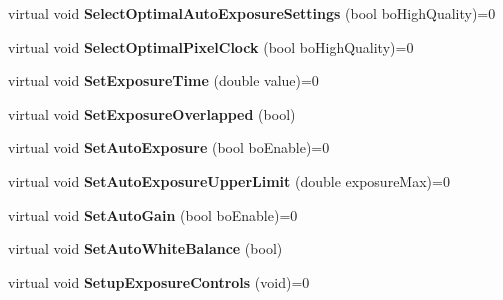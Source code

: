 \begin{DoxyCompactItemize}
\item 
\hypertarget{class_wizard_quick_setup_a2f8ee08dfc710941053f2c117c355d51}{virtual void {\bfseries Select\+Optimal\+Auto\+Exposure\+Settings} (bool bo\+High\+Quality)=0}\label{class_wizard_quick_setup_a2f8ee08dfc710941053f2c117c355d51}

\item 
\hypertarget{class_wizard_quick_setup_a4be31bcd65dd72a6eec785b3e96442d8}{virtual void {\bfseries Select\+Optimal\+Pixel\+Clock} (bool bo\+High\+Quality)=0}\label{class_wizard_quick_setup_a4be31bcd65dd72a6eec785b3e96442d8}

\item 
\hypertarget{class_wizard_quick_setup_a62c9bf4edce91124d4261d2ba4fbc48d}{virtual void {\bfseries Set\+Exposure\+Time} (double value)=0}\label{class_wizard_quick_setup_a62c9bf4edce91124d4261d2ba4fbc48d}

\item 
\hypertarget{class_wizard_quick_setup_a4da8f26366f409a6d160e8e6f76f0ea8}{virtual void {\bfseries Set\+Exposure\+Overlapped} (bool)}\label{class_wizard_quick_setup_a4da8f26366f409a6d160e8e6f76f0ea8}

\item 
\hypertarget{class_wizard_quick_setup_ad79f23a6992b0265f1efc24f1ca22c86}{virtual void {\bfseries Set\+Auto\+Exposure} (bool bo\+Enable)=0}\label{class_wizard_quick_setup_ad79f23a6992b0265f1efc24f1ca22c86}

\item 
\hypertarget{class_wizard_quick_setup_a46362ddeb2aa2b2a419a4c696a3c092a}{virtual void {\bfseries Set\+Auto\+Exposure\+Upper\+Limit} (double exposure\+Max)=0}\label{class_wizard_quick_setup_a46362ddeb2aa2b2a419a4c696a3c092a}

\item 
\hypertarget{class_wizard_quick_setup_a656c377e181391211cf8eedc0215d769}{virtual void {\bfseries Set\+Auto\+Gain} (bool bo\+Enable)=0}\label{class_wizard_quick_setup_a656c377e181391211cf8eedc0215d769}

\item 
\hypertarget{class_wizard_quick_setup_a3fda3472564c2b81a954dd30173fed7e}{virtual void {\bfseries Set\+Auto\+White\+Balance} (bool)}\label{class_wizard_quick_setup_a3fda3472564c2b81a954dd30173fed7e}

\item 
\hypertarget{class_wizard_quick_setup_a8bfe5d897b5ada7fc06c3acd14654ebf}{virtual void {\bfseries Setup\+Exposure\+Controls} (void)=0}\label{class_wizard_quick_setup_a8bfe5d897b5ada7fc06c3acd14654ebf}


\end{DoxyCompactItemize}
